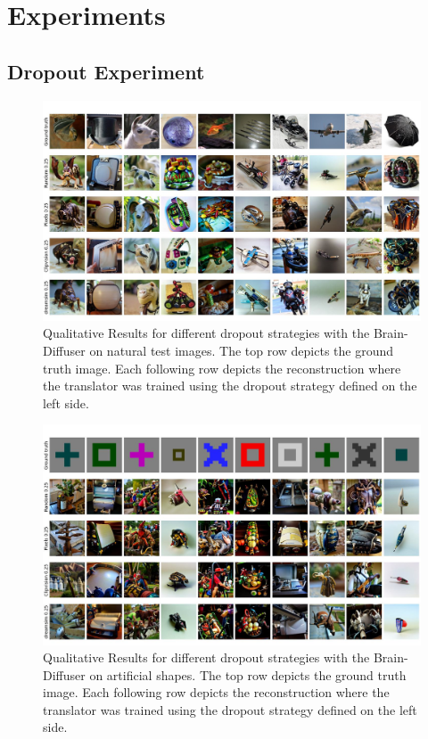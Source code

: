 \chapter{Experiments}
\section{Dropout Experiment}

\begin{figure}[H]
   \centering
   \includegraphics[width=1\textwidth]{plots/dropout_qual_eval_bd_test.JPEG}
   \caption[Experiment 1: Reconstructed images for Brain-Diffuser on natural test images]{Qualitative Results for different dropout strategies with the Brain-Diffuser on natural test images. The top row depicts the ground truth image. Each following row depicts the reconstruction where the translator was trained using the dropout strategy defined on the left side.}\label{fig:dropout_qual_eval_bd_test}
\end{figure}

\begin{figure}[H]
   \centering
   \includegraphics[width=1\textwidth]{plots/dropout_qual_eval_bd_art.JPEG}
   \caption[Experiment 1: Reconstructed images for Brain-Diffuser on artificial shapes]{Qualitative Results for different dropout strategies with the Brain-Diffuser on artificial shapes. The top row depicts the ground truth image. Each following row depicts the reconstruction where the translator was trained using the dropout strategy defined on the left side.}\label{fig:dropout_qual_eval_bd_art}
\end{figure}


